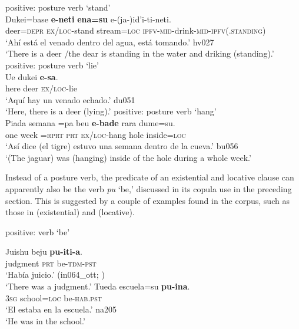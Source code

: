\documentclass[output=paper]{langsci/langscibook}
\begin{document}
\begin{exe}
\ex\label{ex:tacana-posture-stand}  positive: posture verb `stand'\\
\gll {}Dukei=base \textbf{e-neti}
\textbf{ena=su} e-(ja-)id'i-ti-neti.\\
    deer=\textsc{depr}  \textsc{ex/loc}-stand  stream=\textsc{loc}
    \textsc{ipfv}-\textsc{mid}-drink-\textsc{mid-ipfv(.standing)}\\
\glt `Ahí está el venado dentro del agua, está tomando.' hv027\\
`There is a deer \slash  the dear is standing in the water and driking (standing).'
\ex\label{ex:tacana-posture-lie}  positive: posture verb `lie'\\
\gll
    Ue dukei \textbf{e-sa}.\\
    here  deer  \textsc{ex/loc}-lie\\
\glt `Aquí hay un venado echado.' du051\\
`Here, there is a deer (lying).'
\ex\label{ex:tacana-posture-hang}  positive: posture verb `hang'\\
\gll
 {\ob}Piada semana{\cb} =pa beu \textbf{e-bade}
 rara dume=su{\cb}.\\
 one  week  =\textsc{rprt}  \textsc{prt}  \textsc{ex/loc}-hang  hole
 inside\textsc{=loc}\\
\glt `Así dice (el tigre) estuvo una semana dentro de la cueva.' bu056\\
`(The jaguar) was (hanging) inside of the hole during a whole week.'
\end{exe}

Instead of a posture verb, the predicate of an existential and locative
clause can apparently also be the verb \textit{pu} `be,' discussed in its
copula use in the preceding section. This is suggested by a couple of
examples found in the corpus, such as those in
 (existential) and  (locative). 

\begin{exe}\ex
\label{ex:tacana-be-judgement-school}  positive: verb `be' 
\begin{xlist}
\ex\label{ex:tacana-be-judgement}
\gll {}Juishu  beju \textbf{pu-iti-a}.\\
    judgment  \textsc{prt}  be-\textsc{tdm-pst}\\
\glt `Había juicio.' (in064\_ott; \citealt[62]{Ottaviano1980})\\
`There was a judgment.'
\ex\label{ex:tacana-be-school}
\gll  {}Tueda escuela=su \textbf{pu-ina}.\\
    \textsc{3sg}  school=\textsc{loc}  be-\textsc{hab.pst}\\
\glt `El estaba en la escuela.' na205\\
`He was in the school.'
\end{xlist}\end{exe}
\end{document}
